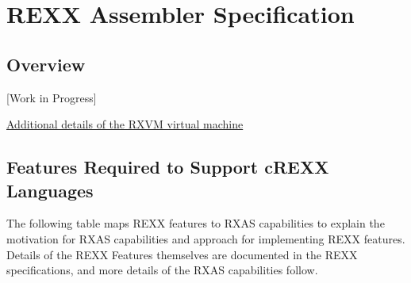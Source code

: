 \hypertarget{rexx-assembler-specification}{%
\section{REXX Assembler
Specification}\label{rexx-assembler-specification}}

\hypertarget{overview}{%
\subsection{Overview}\label{overview}}

{[}Work in Progress{]}

\href{Logical-REXX-VM}{Additional details of the RXVM virtual machine}

\hypertarget{features-required-to-support-crexx-languages}{%
\subsection{Features Required to Support cREXX
Languages}\label{features-required-to-support-crexx-languages}}

The following table maps REXX features to RXAS capabilities to explain
the motivation for RXAS capabilities and approach for implementing REXX
features. Details of the REXX Features themselves are documented in the
REXX specifications, and more details of the RXAS capabilities follow.

